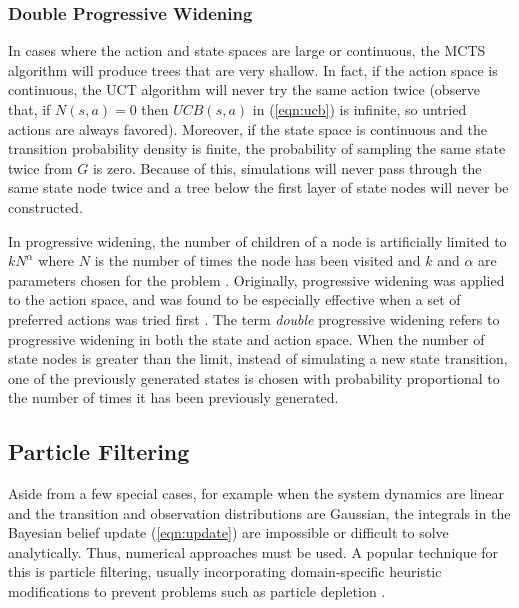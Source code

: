 \subsubsection{Double Progressive Widening} \label{sec:dpw}

In cases where the action and state spaces are large or continuous, the MCTS algorithm will produce trees that are very shallow.
In fact, if the action space is continuous, the UCT algorithm will never try the same action twice (observe that, if $N(s,a) = 0$ then $UCB(s,a)$ in (\ref{eqn:ucb}) is infinite, so untried actions are always favored).
Moreover, if the state space is continuous and the transition probability density is finite, the probability of sampling the same state twice from $G$ is zero.
Because of this, simulations will never pass through the same state node twice and a tree below the first layer of state nodes will never be constructed.

In progressive widening, the number of children of a node is artificially limited to $k N^\alpha$ where $N$ is the number of times the node has been visited and $k$ and $\alpha$ are parameters chosen for the problem \cite{couetoux2011double}.
Originally, progressive widening was applied to the action space, and was found to be especially effective when a set of preferred actions was tried first \cite{browne2012survey}.
The term \emph{double} progressive widening refers to progressive widening in both the state and action space.
When the number of state nodes is greater than the limit, instead of simulating a new state transition, one of the previously generated states is chosen with probability proportional to the number of times it has been previously generated.


\subsection{Particle Filtering} \label{sec:particle}

Aside from a few special cases, for example when the system dynamics are linear and the transition and observation distributions are Gaussian, the integrals in the Bayesian belief update (\ref{eqn:update}) are impossible or difficult to solve analytically.
Thus, numerical approaches must be used.
A popular technique for this is particle filtering, usually incorporating domain-specific heuristic modifications to prevent problems such as particle depletion \cite{thrun2005probabilistic}.

